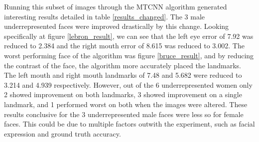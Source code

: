 \documentclass{l4proj}
\begin{document}
Running this subset of images through the MTCNN algorithm generated interesting results detailed in table \ref{results_changed}. The 3 male underrepresented faces were improved drastically by this change. Looking specifically at figure \ref{lebron_result}, we can see that the left eye error of 7.92 was reduced to 2.384 and the right mouth error of 8.615 was reduced to 3.002. The worst performing face of the algorithm was figure  \ref{bruce_result}, and by reducing the contrast of the face, the algorithm more accurately placed the landmarks. The left mouth and right mouth landmarks of 7.48 and 5.682 were reduced to 3.214 and 4.939 respectively. However, out of the 6 underrepresented women only 2 showed improvement on both landmarks, 3 showed improvement on a single landmark, and 1 performed worst on both when the images were altered. These results conclusive for the 3 underrepresented male faces were less so for female faces. This could be due to multiple factors outwith the experiment, such as facial expression and ground truth accuracy. 
\end{document}
